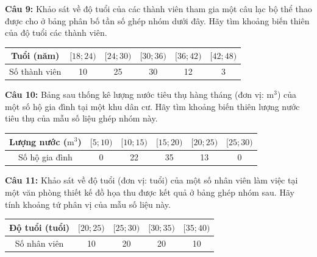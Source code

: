 \documentclass[12pt]{article}
\begin{document}
	\vspace{4mm}
	
	\noindent \textbf{Câu 9:} Khảo sát về độ tuổi của các thành viên tham gia một câu lạc bộ thể thao được cho ở bảng phân bố tần số ghép nhóm dưới đây. Hãy tìm khoảng biến thiên của độ tuổi các thành viên.
	\begin{center}
		\renewcommand{\arraystretch}{1.3}
		\begin{tabular}{|c|c|c|c|c|c|}
			\hline
			Tuổi (năm) & $[18; 24)$ & $[24; 30)$ & $[30; 36)$ & $[36; 42)$ & $[42; 48)$ \\
			\hline
			Số thành viên & 10 & 25 & 30 & 12 & 3 \\
			\hline
		\end{tabular}
	\end{center}
	
	\vspace{4mm}
	
	\noindent \textbf{Câu 10:} Bảng sau thống kê lượng nước tiêu thụ hàng tháng (đơn vị: $\text{m}^3$) của một số hộ gia đình tại một khu dân cư. Hãy tìm khoảng biến thiên lượng nước tiêu thụ của mẫu số liệu ghép nhóm này.
	\begin{center}
		\renewcommand{\arraystretch}{1.3}
		\begin{tabular}{|c|c|c|c|c|c|}
			\hline
			Lượng nước ($\text{m}^3$) & $[5; 10)$ & $[10; 15)$ & $[15; 20)$ & $[20; 25)$ & $[25; 30)$ \\
			\hline
			Số hộ gia đình & 0 & 22 & 35 & 13 & 0 \\
			\hline
		\end{tabular}
	\end{center}
	
	\vspace{4mm}
	
	\noindent \textbf{Câu 11:} Khảo sát về độ tuổi (đơn vị: tuổi) của một số nhân viên làm việc tại một văn phòng thiết kế đồ họa thu được kết quả ở bảng ghép nhóm sau. Hãy tính khoảng tứ phân vị của mẫu số liệu này.
	\begin{center}
		\renewcommand{\arraystretch}{1.3}
		\begin{tabular}{|c|c|c|c|c|}
			\hline
			Độ tuổi (tuổi) & $[20; 25)$ & $[25; 30)$ & $[30; 35)$ & $[35; 40)$ \\
			\hline
			Số nhân viên & 10 & 20 & 20 & 10 \\
			\hline
		\end{tabular}
	\end{center}
	
	\vspace{4mm}
	
\end{document}
